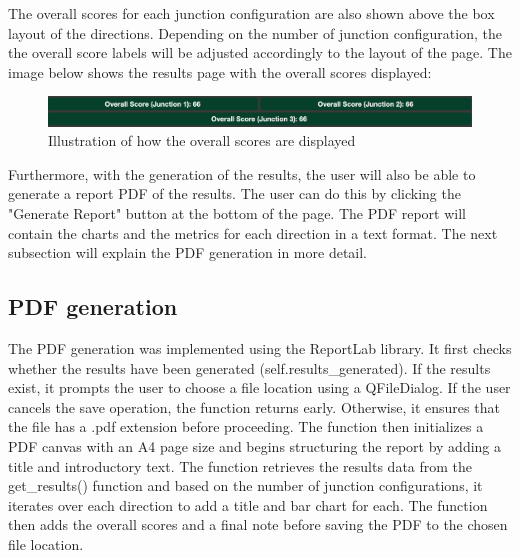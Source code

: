 \documentclass{article}
\begin{document}
    The overall scores for each junction configuration are also shown above the box layout of the directions. Depending on the number of junction configuration, the
    the overall score labels will be adjusted accordingly to the layout of the page. The image below shows the results page with the overall scores displayed:

    \begin{figure}[H]
        \centering
        \includegraphics[width=\textwidth]{overallScores}
        \caption{Illustration of how the overall scores are displayed}
        \label{fig:overallScores}
    \end{figure}

    Furthermore, with the generation of the results, the user will also be able to generate a report PDF of the results. The user can do this by clicking the "Generate Report" button at the bottom of the page.
    The PDF report will contain the charts and the metrics for each direction in a text format. The next subsection will explain the PDF generation in more detail.

    \subsection{PDF generation}

    The PDF generation was implemented using the ReportLab library. It first checks whether the results have been generated (self.results\_generated). If the results exist, it prompts the user to choose a file
    location using a QFileDialog. If the user cancels the save operation, the function returns early. Otherwise, it ensures that the file has a .pdf extension before proceeding. The function then initializes a
    PDF canvas with an A4 page size and begins structuring the report by adding a title and introductory text. The function retrieves the results data from the get\_results() function and based on the number of junction
    configurations, it iterates over each direction to add a title and bar chart for each. The function then adds the overall scores and a final note before saving the PDF to the chosen file location.
\end{document}
